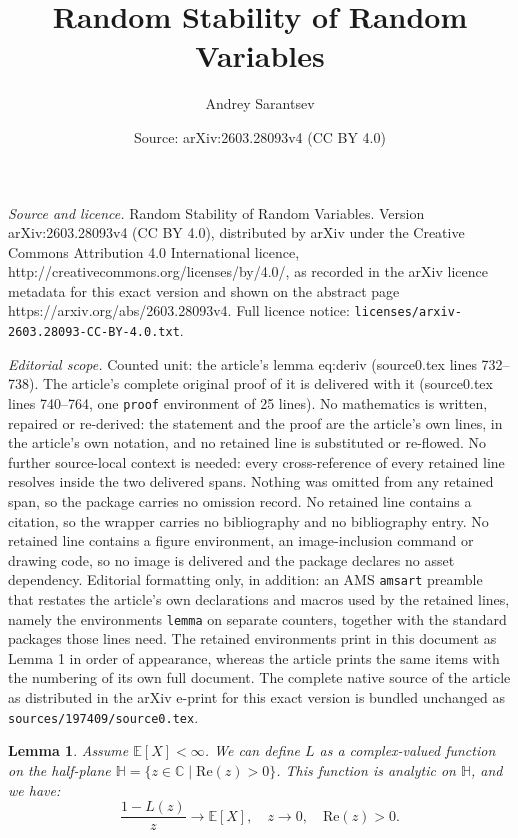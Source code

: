 \documentclass[10pt,a4paper]{amsart}
\title{Random Stability of Random Variables}
\author{Andrey Sarantsev}
\date{Source: arXiv:2603.28093v4 (CC BY 4.0)}
\newtheorem{lemma}{Lemma}
\begin{document}
\maketitle

\noindent\emph{Source and licence.} Random Stability of Random Variables. Version arXiv:2603.28093v4 (CC BY 4.0), distributed by arXiv under the Creative Commons Attribution 4.0 International licence, http://creativecommons.org/licenses/by/4.0/, as recorded in the arXiv licence metadata for this exact version and shown on the abstract page https://arxiv.org/abs/2603.28093v4. Full licence notice: \texttt{licenses/arxiv-2603.28093-CC-BY-4.0.txt}.\par\smallskip

\noindent\textit{Editorial scope.} Counted unit: the article's lemma eq:deriv (source0.tex lines 732--738). The article's complete original proof of it is delivered with it (source0.tex lines 740--764, one \texttt{proof} environment of 25 lines). No mathematics is written, repaired or re-derived: the statement and the proof are the article's own lines, in the article's own notation, and no retained line is substituted or re-flowed.  No further source-local context is needed: every cross-reference of every retained line resolves inside the two delivered spans.  Nothing was omitted from any retained span, so the package carries no omission record.  No retained line contains a citation, so the wrapper carries no bibliography and no bibliography entry.  No retained line contains a figure environment, an image-inclusion command or drawing code, so no image is delivered and the package declares no asset dependency.  Editorial formatting only, in addition: an AMS \texttt{amsart} preamble that restates the article's own declarations and macros used by the retained lines, namely the environments \texttt{lemma} on separate counters, together with the standard packages those lines need.  The retained environments print in this document as Lemma 1 in order of appearance, whereas the article prints the same items with the numbering of its own full document.  The complete native source of the article as distributed in the arXiv e-print for this exact version is bundled unchanged as \texttt{sources/197409/source0.tex}.
\begin{lemma} Assume $\mathbb E[X] < \infty$. We can define $L$ as a complex-valued function on the half-plane $\mathbb H = \{z \in \mathbb C\mid \mathrm{Re}(z) > 0\}$. This function is analytic on $\mathbb H$, and we have: 
\begin{equation}
\label{eq:deriv}
\frac{1 - L(z)}{z} \to \mathbb E[X],\quad z \to 0,\quad \mathrm{Re}(z) > 0.
\end{equation}
\label{lemma:tech}
\end{lemma}
\end{document}

